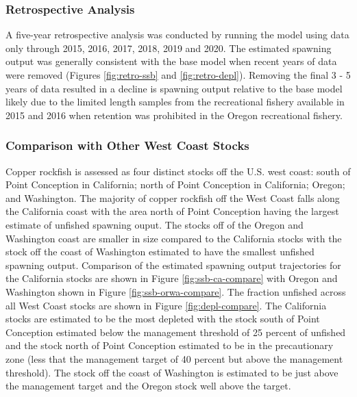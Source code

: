\documentclass[11pt,
  english,
  a4paper,
]{article}
\begin{document}
\leavevmode\tagmcend\tagstructend\par


\hypertarget{retrospective-analysis}{%
\subsubsection{Retrospective Analysis}\label{retrospective-analysis}}

\leavevmode\tagmcend\tagstructend


A five-year retrospective analysis was conducted by running the model using data only through 2015, 2016, 2017, 2018, 2019 and 2020. The estimated spawning output was generally consistent with the base model when recent years of data were removed (Figures \ref{fig:retro-ssb} and \ref{fig:retro-depl}). Removing the final 3 - 5 years of data resulted in a decline is spawning output relative to the base model likely due to the limited length samples from the recreational fishery available in 2015 and 2016 when retention was prohibited in the Oregon recreational fishery.

\leavevmode\tagmcend\tagstructend\par


\hypertarget{comparison-with-other-west-coast-stocks}{%
\subsubsection{Comparison with Other West Coast Stocks}\label{comparison-with-other-west-coast-stocks}}

\leavevmode\tagmcend\tagstructend


Copper rockfish is assessed as four distinct stocks off the U.S. west coast: south of Point Conception in California; north of Point Conception in California; Oregon; and Washington. The majority of copper rockfish off the West Coast falls along the California coast with the area north of Point Conception having the largest estimate of unfished spawning ouput. The stocks off of the Oregon and Washington coast are smaller in size compared to the California stocks with the stock off the coast of Washington estimated to have the smallest unfished spawning output. Comparison of the estimated spawning output trajectories for the California stocks are shown in Figure \ref{fig:ssb-ca-compare} with Oregon and Washington shown in Figure \ref{fig:ssb-orwa-compare}. The fraction unfished across all West Coast stocks are shown in Figure \ref{fig:depl-compare}. The California stocks are estimated to be the most depleted with the stock south of Point Conception estimated below the management threshold of 25 percent of unfished and the stock north of Point Conception estimated to be in the precautionary zone (less that the management target of 40 percent but above the management threshold). The stock off the coast of Washington is estimated to be just above the management target and the Oregon stock well above the target.
\end{document}
